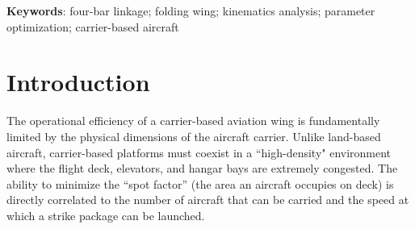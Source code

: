 \documentclass[11pt,a4paper]{article}
\begin{document}
\newpage
{}
\begin{abstract}
Carrier-based aircraft operate in highly constrained environments where flight deck and hangar spaces are at an absolute premium. To maximize the operational capacity and sortie generation rates of aircraft carriers, reliable wing-folding mechanisms are strictly required. This project presents the comprehensive design and analysis of a planar four-bar linkage mechanism tailored for this specific task. Through iterative parameter optimization and Grashof criterion verification, the proposed mechanism successfully achieves a strict operational folding range of $0^\circ$--$135^\circ$ while adhering to critical spatial restrictions. Kinematics simulation and dynamic analysis are systematically conducted to evaluate the velocity and acceleration profiles, ensuring that the mechanism operates smoothly without generating excessive inertial forces that could compromise the hinge joints. Python programming is employed for trajectory and numerical simulation, whereas SolidWorks is utilized for robust 3D modeling and dynamic motion demonstration. The integrated results verify that the synthesized four-bar mechanism functions reliably, mitigating mechanical jamming and fully satisfying the deployment and stowage requirements of modern carrier-based aircraft.
\end{abstract}

\textbf{Keywords}: four-bar linkage; folding wing; kinematics analysis; parameter optimization; carrier-based aircraft

\clearpage
\tableofcontents
\clearpage

\setcounter{page}{1}

\section{Introduction}

The operational efficiency of a carrier-based aviation wing is fundamentally limited by the physical dimensions of the aircraft carrier. Unlike land-based aircraft, carrier-based platforms must coexist in a ``high-density" environment where the flight deck, elevators, and hangar bays are extremely congested. The ability to minimize the ``spot factor'' (the area an aircraft occupies on deck) is directly correlated to the number of aircraft that can be carried and the speed at which a strike package can be launched.
\end{document}
